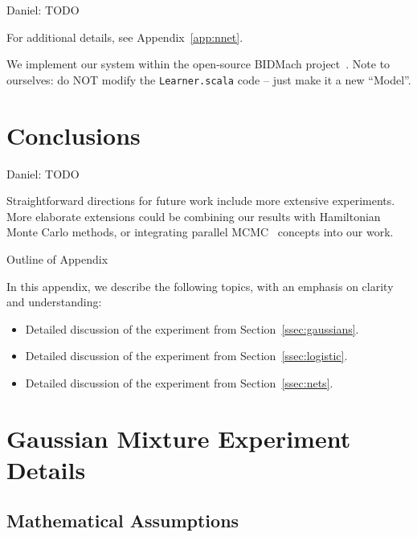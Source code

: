 \documentclass{article}
\begin{document}
{\color{blue}
Daniel: TODO

For additional details, see Appendix~\ref{app:nnet}.
}

We implement our system within the open-source BIDMach project~\cite{canny2013bidmach}. Note to
ourselves: do NOT modify the \texttt{Learner.scala} code -- just make it a new ``Model''.




\section{Conclusions}\label{sec:conclusion}

{\color{blue}
Daniel: TODO
}

Straightforward directions for future work include more extensive experiments. More elaborate
extensions could be combining our results with Hamiltonian Monte Carlo methods, or integrating
parallel MCMC~\cite{conf/uai/AngelinoKWSA14} concepts into our work.


\small


\normalsize

\clearpage
\appendix

\begin{center}
{\Large Outline of Appendix}
\end{center}

In this appendix, we describe the following topics, with an emphasis on clarity and understanding:

\begin{itemize}[noitemsep]
    \item Detailed discussion of the experiment from Section~\ref{ssec:gaussians}.
    \item Detailed discussion of the experiment from Section~\ref{ssec:logistic}.
    \item Detailed discussion of the experiment from Section~\ref{ssec:nets}.
\end{itemize}

\section{Gaussian Mixture Experiment Details}\label{app:gaussian}

\subsection{Mathematical Assumptions}
\end{document}
